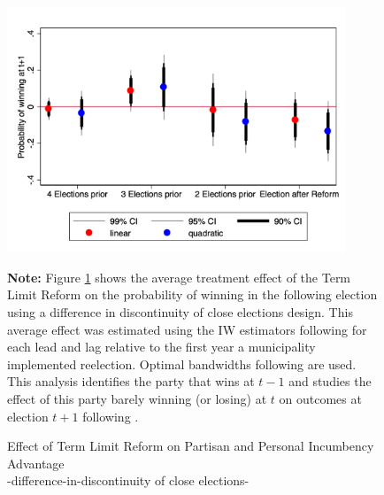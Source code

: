 \documentclass[12pt]{amsart}
\numberwithin{equation}{section}
\theoremstyle{definition}
\theoremstyle{definition}
\theoremstyle{definition}
\begin{document}
   
   
 \begin{figure}[H]   
\centering
 \caption{Effect of Term Limit Reform on Partisan and Personal Incumbency Advantage \\ -difference-in-discontinuity of close elections-}
 \label{fig:parallel_trend}
\includegraphics[width=0.9\textwidth]{../Figures/parallel_trends_incumbency.png}
       \captionsetup{justification=centering}
         
 \textbf{Note:} Figure \ref{fig:parallel_trend} shows the average treatment effect of the Term Limit Reform on the probability of winning in the following election using a difference in discontinuity of close elections design. This average effect was estimated using the IW estimators following \citet{abraham_sun_2020} for each lead and lag relative to the first year a municipality implemented reelection. Optimal bandwidths following \citet{calonicoetal_2014} are used. This analysis identifies the party that wins at $t-1$ and studies the effect of this party barely winning (or losing) at $t$ on outcomes at election $t+1$ following \citet{klasnja_titiunik_2017}.  
 
\end{figure}  
\end{document}
